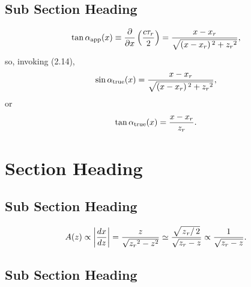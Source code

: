 \subsection{Sub Section Heading}


\lipsum[5]

\lipsum[5]


\lipsum[3]
\begin{equation}\tan  \alpha _{\text{app}}(\text{\textit{$x$}})\equiv \frac{\partial }{\partial \text{\textit{$x$}}}\left(\frac{\text{\textit{$c\tau
_r$}}}{2}\right)=\text{\textit{$\frac{x-x_r}{\sqrt{\left(x-x_r\right){}^2+z_r{}^2}}$}},\end{equation}
so, invoking (2.14),
\begin{equation}\sin  \alpha _{\text{true}}(\text{\textit{$x$}})=\text{\textit{$\frac{x-x_r}{\sqrt{\left(x-x_r\right){}^2+z_r{}^2}}$}},\end{equation}
or
\begin{equation}\tan  \alpha _{\text{true}}(\text{\textit{$x$}})=\text{\textit{$\frac{x-x_r}{z_r}$}}.\end{equation}

\lipsum[5]

\begin{remark}
\lipsum[5]
\end{remark}

\lipsum[5]


\section{Section Heading}
\subsection{Sub Section Heading}

\lipsum[5]
\begin{equation}\text{\textit{$A$}}(\text{\textit{$z$}})\propto \left|\frac{d\text{\textit{$x$}}}{d\text{\textit{$z$}}}\right|=\frac{\text{\textit{$z$}}}{\sqrt{\text{\textit{$z_r$}}{}^2-\text{\textit{$z$}}^2}}\simeq
\frac{\text{\textit{$\sqrt{\left.\text{\textit{$z$}}_r\right/2}$}}}{\sqrt{\text{\textit{$z_r$}}-\text{\textit{$z$}}}}\propto \frac{1}{\sqrt{\text{\textit{$z_r$}}-\text{\textit{$z$}}}}.\end{equation}
\lipsum[5]

\subsection{Sub Section Heading}


